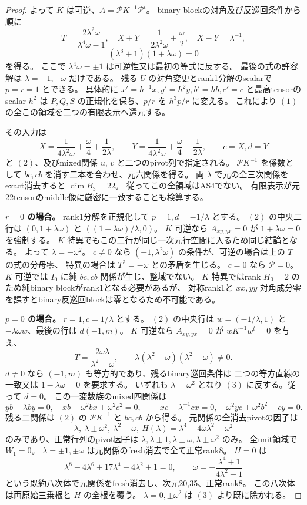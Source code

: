 \begin{proof}
よって $K$ は可逆、$A=\mathcal P K^{-1}\mathcal P^t$。
binary blockの対角及び反巡回条件から順に
\[
 T=\frac{2\lambda^2\omega}{\lambda^4\omega-1},\quad
 X+Y=\frac1{2\lambda^2\omega}+\frac\omega2,\quad X-Y=\lambda^{-1},
\]
\[
 (\lambda^3+1)(1+\lambda\omega)=0
\]
を得る。
ここで $\lambda^4\omega=\pm1$ は可逆性又は最初の等式に反する。
最後の式の許容解は $\lambda=-1,-\omega$ だけである。
残る $U$ の対角変更とrank1分解のscalarで $p=r=1$ とできる。
具体的に $x'=h^{-1}x,y'=h^2y,b'=hb,c'=c$ と最高tensorのscalar $h^2$ は
$P,Q,S$ の正規化を保ち、$p/r$ を $h^3p/r$ に変える。
これにより $(1)$ の全この領域を二つの有限表示へ還元する。

その入力は
\[
 X=\frac1{4\lambda^2\omega}+\frac\omega4+\frac1{2\lambda},\qquad
 Y=\frac1{4\lambda^2\omega}+\frac\omega4-\frac1{2\lambda},\qquad c=X,d=Y
\]
と $(2)$、及びmixed関係 $u$, $v$ と二つのpivot列で指定される。
$\mathcal P K^{-1}$ を係数として $bc,cb$ を消す二本を合わせ、元六関係を得る。
両 $\lambda$ で元の全三次関係をexact消去すると $\dim B_3=22$。
従ってこの全領域はAS4でない。
有限表示が元22tensorのmiddle像に厳密に一致することも検算する。

\textbf{$r=0$ の場合。}
rank1分解を正規化して $p=1,d=-1/\lambda$ とする。
$(2)$ の中央二行は
$(0,1+\lambda\omega)$ と $((1+\lambda\omega)/\lambda,0)$。
$K$ 可逆なら $A_{xy,yx}=0$ が $1+\lambda\omega=0$ を強制する。
$K$ 特異でもこの二行が同じ一次元行空間に入るため同じ結論となる。
よって $\lambda=-\omega^2$。
$c\ne0$ なら $(-1,\lambda^2\omega)$ の条件が、可逆の場合は上の $T$ の式の分母零、
特異の場合は $T^2=-\omega$ との矛盾を生じる。
$c=0$ なら $\mathcal P=0$。
$K$ 可逆では $I_0$ に純 $bc,cb$ 関係が生じ、整域でない。
$K$ 特異ではrank $H_0=2$ のため純binary blockがrank1となる必要があるが、
対称rank1と $xx,yy$ 対角成分零を課すとbinary反巡回blockは零となるため不可能である。

\textbf{$p=0$ の場合。}
$r=1,c=1/\lambda$ とする。
$(2)$ の中央行は $w=(-1/\lambda,1)$ と $-\lambda\omega w$、最後の行は $d(-1,m)$。
$K$ 可逆なら $A_{xy,yx}=0$ が $wK^{-1}w^t=0$ を与え、
\[
 T=\frac{2\omega\lambda}{\lambda^2-\omega},\qquad
 \lambda(\lambda^2-\omega)(\lambda^2+\omega)\ne0.
\tag{3}
\]
$d\ne0$ なら $(-1,m)$ も等方的であり、残るbinary巡回条件は
二つの等方直線の一致又は $1-\lambda\omega=0$ を要求する。
いずれも $\lambda=\omega^2$ となり $(3)$ に反する。従って $d=0$。
この一変数族のmixed四関係は
\[
 yb-\lambda by=0,\quad xb-\omega^2bx+\omega^2c^2=0,\quad
 -xc+\lambda^{-1}cx=0,\quad \omega^2yc+\omega^2b^2-cy=0.
\tag{4}
\]
残る二関係は $(2)$ の $\mathcal P K^{-1}$ と $bc,cb$ から得る。
元関係の全消去pivotの因子は
\[
 \lambda,\ \lambda\pm\omega^2,\ \lambda^2+\omega,\
 H(\lambda)=\lambda^4+4\omega\lambda^2-\omega^2
\]
のみであり、正常行列のpivot因子は
$\lambda,\lambda\pm1,\lambda\pm\omega,\lambda\pm\omega^2$ のみ。
全unit領域で $W_1=0$。
$\lambda=\pm1,\pm\omega$ は元関係のfresh消去で全て正常rank8。
$H=0$ は
\[
 \lambda^8-4\lambda^6+17\lambda^4+4\lambda^2+1=0,\qquad
 \omega=-\frac{\lambda^4+1}{4\lambda^2+1}
\]
という既約八次体で元関係をfresh消去し、次元20,35、正常rank8。
この八次体は両原始三乗根と $H$ の全根を覆う。
$\lambda=0,\pm\omega^2$ は $(3)$ より既に除かれる。


\end{proof}
